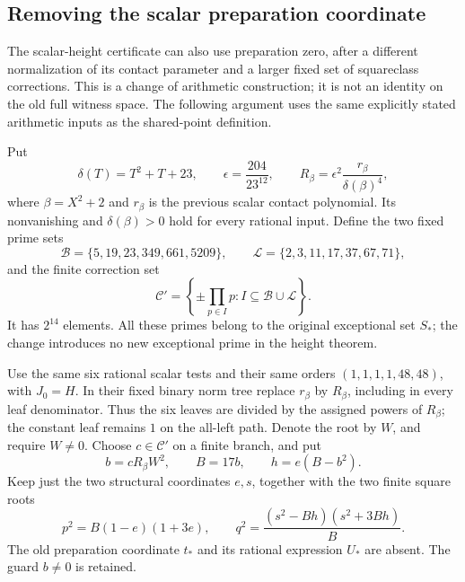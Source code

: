 \subsection{Removing the scalar preparation coordinate}
\label{subsec:scalar-preparation-zero}

The scalar-height certificate can also use preparation zero, after a
different normalization of its contact parameter and a larger fixed set
of squareclass corrections.  This is a change of arithmetic construction;
it is not an identity on the old full witness space.  The following
argument uses the same explicitly stated arithmetic inputs as the
shared-point definition.

Put
\[
 \delta(T)=T^2+T+23,\qquad \epsilon=\frac{204}{23^{12}},
 \qquad R_\beta=\epsilon^2\frac{r_\beta}{\delta(\beta)^4},
\]
where $\beta=X^2+2$ and $r_\beta$ is the previous scalar contact
polynomial.  Its nonvanishing and $\delta(\beta)>0$ hold for every
rational input.  Define the two fixed prime sets
\[
 \mathcal B=\{5,19,23,349,661,5209\},\qquad
 \mathcal L=\{2,3,11,17,37,67,71\},
\]
and the finite correction set
\[
 \mathcal C'=\left\{\pm\prod_{p\in I}p:
                   I\subseteq\mathcal B\cup\mathcal L\right\}.
\]
It has $2^{14}$ elements.  All these primes belong to the original
exceptional set $S_*$; the change introduces no new exceptional prime
in the height theorem.

Use the same six rational scalar tests and their same orders
$(1,1,1,1,48,48)$, with $J_0=H$.  In their fixed binary norm tree
replace $r_\beta$ by $R_\beta$, including in every leaf denominator.
Thus the six leaves are divided by the assigned powers of $R_\beta$;
the constant leaf remains $1$ on the all-left path.  Denote the root
by $W$, and require $W\ne0$.  Choose $c\in\mathcal C'$ on a finite
branch, and put
\[
 b=cR_\beta W^2,\qquad B=17b,\qquad h=e(B-b^2).
\]
Keep just the two structural coordinates $e,s$, together with the
two finite square roots
\[
 p^2=B(1-e)(1+3e),\qquad
 q^2=\frac{(s^2-Bh)(s^2+3Bh)}B.
\]
The old preparation coordinate $t_*$ and its rational expression
$U_*$ are absent.  The guard $b\ne0$ is retained.

